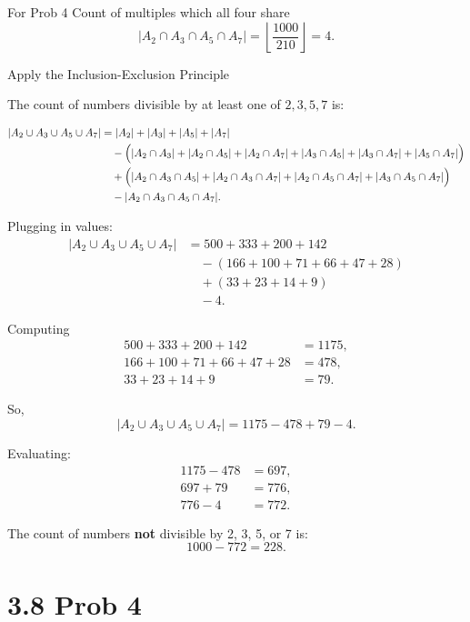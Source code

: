 \documentclass{report}
\begin{document}
\begin{RemarkWithLily}{For Prob 4}
  Count of multiples which all four share 
  \[
  |A_2 \cap A_3 \cap A_5 \cap A_7| = \left\lfloor \frac{1000}{210} \right\rfloor = 4.
  \]
  
  Apply the Inclusion-Exclusion Principle
  
  The count of numbers divisible by at least one of \(2,3,5,7\) is:
  
  \[
  \begin{aligned}
  |A_2 \cup A_3 \cup A_5 \cup A_7| &= |A_2|+|A_3|+|A_5|+|A_7| \\
  &\quad - \Bigl(|A_2 \cap A_3| + |A_2 \cap A_5| + |A_2 \cap A_7| + |A_3 \cap A_5| + |A_3 \cap A_7| + |A_5 \cap A_7|\Bigr)\\
  &\quad + \Bigl(|A_2 \cap A_3 \cap A_5| + |A_2 \cap A_3 \cap A_7| + |A_2 \cap A_5 \cap A_7| + |A_3 \cap A_5 \cap A_7|\Bigr)\\
  &\quad - |A_2 \cap A_3 \cap A_5 \cap A_7|.
  \end{aligned}
  \]
  
  Plugging in values:
  \[
  \begin{aligned}
  |A_2 \cup A_3 \cup A_5 \cup A_7| &= 500 + 333 + 200 + 142 \\
  &\quad - (166 + 100 + 71 + 66 + 47 + 28) \\
  &\quad + (33 + 23 + 14 + 9) \\
  &\quad - 4.
  \end{aligned}
  \]
  
  Computing 
  \[
  \begin{aligned}
  500+333+200+142 &= 1175, \\
  166+100+71+66+47+28 &= 478, \\
  33+23+14+9 &= 79.
  \end{aligned}
  \]
  
  So,
  \[
  |A_2 \cup A_3 \cup A_5 \cup A_7| = 1175 - 478 + 79 - 4.
  \]
  
  Evaluating:
  \[
  \begin{aligned}
  1175 - 478 &= 697, \\
  697 + 79 &= 776, \\
  776 - 4 &= 772.
  \end{aligned}
  \]
  
  The count of numbers \textbf{not} divisible by 2, 3, 5, or 7 is:
  \[
  1000 - 772 = 228.
  \]

\end{RemarkWithLily}

\section*{3.8 Prob 4}

\end{document}
